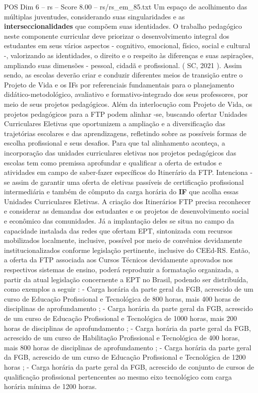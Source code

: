\begin{textsample}{POS Dim 6 – rs – Score 8.00 – rs/rs\_em\_85.txt}
Um espaço de acolhimento das múltiplas juventudes, considerando suas singularidades e as \textbf{interseccionalidades} que compõem suas identidades.
O trabalho pedagógico neste componente curricular deve priorizar o desenvolvimento integral dos estudantes em seus vários aspectos - cognitivo, emocional, físico, social e cultural -, valorizando as identidades, o direito e o respeito às diferenças e suas aspirações, ampliando suas dimensões - pessoal, cidadã e profissional. ( SC, 2021 ).
Assim sendo, as escolas deverão criar e conduzir diferentes meios de transição entre o Projeto de Vida e os IFs por referenciais fundamentais para o planejamento didático-metodológico, avaliativo e formativo-integrado dos seus professores, por meio de seus projetos pedagógicos.
Além da interlocução com Projeto de Vida, os projetos pedagógicos para a FTP podem alinhar -se, buscando ofertar Unidades Curriculares Eletivas que oportunizem a ampliação e a diversificação das trajetórias escolares e das aprendizagens, refletindo sobre as possíveis formas de escolha profissional e seus desafios.
Para que tal alinhamento aconteça, a incorporação das unidades curriculares eletivas nos projetos pedagógicos das escolas tem como premissa aprofundar e qualificar a oferta de estudos e atividades em campo de saber-fazer específicos do Itinerário da FTP.
Intenciona -se assim de garantir uma oferta de eletivas passíveis de certificação profissional intermediária e também de cômputo da carga horária do \textbf{IF} que acolha essas Unidades Curriculares Eletivas.
A criação dos Itinerários FTP precisa reconhecer e considerar as demandas dos estudantes e os projetos de desenvolvimento social e econômico das comunidades.
Já a implantação deles se situa no campo da capacidade instalada das redes que ofertam EPT, sintonizada com recursos mobilizados localmente, inclusive, possível por meio de convênios devidamente institucionalizados conforme legislação pertinente, inclusive do CEEd-RS.
Então, a oferta da FTP associada aos Cursos Técnicos devidamente aprovados nos respectivos sistemas de ensino, poderá reproduzir a formatação organizada, a partir da atual legislação concernente a EPT no Brasil, podendo ser distribuída, como exemplos a seguir : - Carga horária da parte geral da FGB, acrescido de um curso de Educação Profissional e Tecnológica de 800 horas, mais 400 horas de disciplinas de aprofundamento ; - Carga horária da parte geral da FGB, acrescido de um curso de Educação Profissional e Tecnológica de 1000 horas, mais 200 horas de disciplinas de aprofundamento ; - Carga horária da parte geral da FGB, acrescido de um curso de Habilitação Profissional e Tecnológica de 400 horas, mais 800 horas de disciplinas de aprofundamento ; - Carga horária da parte geral da FGB, acrescido de um curso de Educação Profissional e Tecnológica de 1200 horas ; - Carga horária da parte geral da FGB, acrescido de conjunto de cursos de qualificação profissional pertencentes ao mesmo eixo tecnológico com carga horária mínima de 1200 horas.

\end{textsample}
